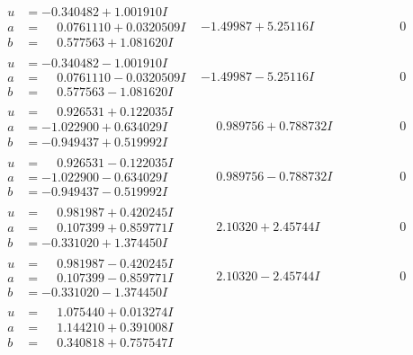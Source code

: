 \documentclass[1p]{elsarticle_modified}
\theoremstyle{definition}
\begin{document}
$$\begin{array}{c|c|c}
\begin{aligned}
u &= -0.340482 + 1.001910 I \\
a &= \phantom{-}0.0761110 + 0.0320509 I \\
b &= \phantom{-}0.577563 + 1.081620 I\end{aligned}
 & -1.49987 + 5.25116 I & \phantom{-0.000000 } 0 \\ \hline\begin{aligned}
u &= -0.340482 - 1.001910 I \\
a &= \phantom{-}0.0761110 - 0.0320509 I \\
b &= \phantom{-}0.577563 - 1.081620 I\end{aligned}
 & -1.49987 - 5.25116 I & \phantom{-0.000000 } 0 \\ \hline\begin{aligned}
u &= \phantom{-}0.926531 + 0.122035 I \\
a &= -1.022900 + 0.634029 I \\
b &= -0.949437 + 0.519992 I\end{aligned}
 & \phantom{-}0.989756 + 0.788732 I & \phantom{-0.000000 } 0 \\ \hline\begin{aligned}
u &= \phantom{-}0.926531 - 0.122035 I \\
a &= -1.022900 - 0.634029 I \\
b &= -0.949437 - 0.519992 I\end{aligned}
 & \phantom{-}0.989756 - 0.788732 I & \phantom{-0.000000 } 0 \\ \hline\begin{aligned}
u &= \phantom{-}0.981987 + 0.420245 I \\
a &= \phantom{-}0.107399 + 0.859771 I \\
b &= -0.331020 + 1.374450 I\end{aligned}
 & \phantom{-}2.10320 + 2.45744 I & \phantom{-0.000000 } 0 \\ \hline\begin{aligned}
u &= \phantom{-}0.981987 - 0.420245 I \\
a &= \phantom{-}0.107399 - 0.859771 I \\
b &= -0.331020 - 1.374450 I\end{aligned}
 & \phantom{-}2.10320 - 2.45744 I & \phantom{-0.000000 } 0 \\ \hline\begin{aligned}
u &= \phantom{-}1.075440 + 0.013274 I \\
a &= \phantom{-}1.144210 + 0.391008 I \\
b &= \phantom{-}0.340818 + 0.757547 I\end{aligned}

\end{array}$$
\end{document}
